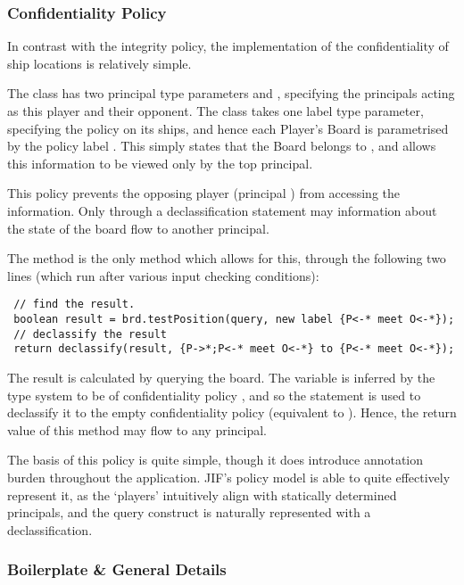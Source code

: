 \subsubsection{Confidentiality Policy}

In contrast with the integrity policy, the implementation of the confidentiality of ship locations is relatively simple.

 The  class has two principal type parameters  and , specifying the principals acting as this player and their opponent. The  class takes one label type parameter, specifying the policy on its ships, and hence each Player's Board is parametrised by the policy label . This simply states that the Board belongs to , and  allows this information to be viewed only by the top principal.
 
 This policy prevents the opposing player (principal ) from accessing the information. Only through a declassification statement may information about the state of the board flow to another principal.
 
 The  method is the only method which allows for this, through the following two lines (which run after various input checking conditions):
 
 \begin{verbatim}
 // find the result.
 boolean result = brd.testPosition(query, new label {P<-* meet O<-*});
 // declassify the result
 return declassify(result, {P->*;P<-* meet O<-*} to {P<-* meet O<-*});
 \end{verbatim}
 
 The result is calculated by querying the board. The  variable is inferred by the type system to be of confidentiality policy , and so the  statement is used to declassify it to the empty confidentiality policy \jiflabel{} (equivalent to \jiflabel{_->_}). Hence, the return value of this method may flow to any principal.
 
 The basis of this policy is quite simple, though it does introduce annotation burden throughout the application. JIF's policy model is able to quite effectively represent it, as the `players' intuitively align with statically determined principals, and the query construct is naturally represented with a declassification.

\clearpage

\subsubsection{Boilerplate \& General Details}

